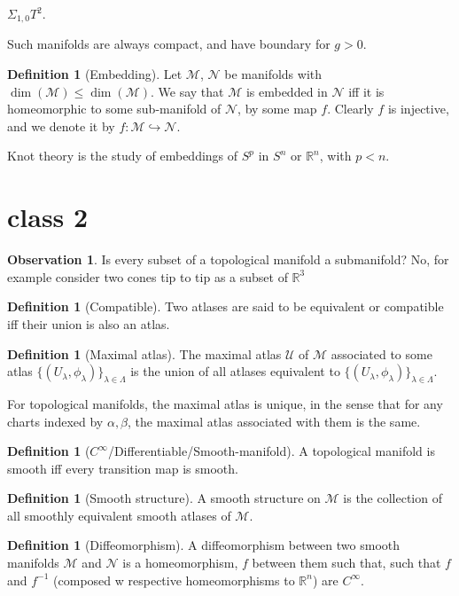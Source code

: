 \documentclass[12pt]{report}
\theoremstyle{definition}
\newtheorem{defn}[thm]{Definition}
\newtheorem*{observation}{Observation}
\newcommand{\bb}[1]{\mathbb{#1}}
\renewcommand{\cal}[1]{\mathcal{#1}}
\begin{document}
$\Sigma_{1, 0} T^2$.

Such manifolds are always compact, and have boundary for $g>0$.

\begin{defn}[Embedding]
Let $\cal{M}$, $\cal{N}$ be manifolds with $\dim(\cal{M}) \leq \dim(\cal{M})$. We say that $\cal{M}$ is embedded in $\cal{N}$ iff it is homeomorphic to some sub-manifold of $\cal{N}$, by some map $f$.
Clearly $f$ is injective, and we denote it by $f: \cal{M} \hookrightarrow \cal{N}$.
\end{defn}

Knot theory is the study of embeddings of $S^p$ in $S^n$ or $\bb{R}^n$, with $p< n$.

\section{class 2}

\begin{observation}
Is every subset of a topological manifold a submanifold? No, for example consider two cones tip to tip as a subset of $\bb{R}^3$
\end{observation}
\begin{defn}[Compatible]
Two atlases are said to be equivalent or compatible iff their union is also an atlas.
\end{defn}

\begin{defn}[Maximal atlas]
The maximal atlas $\cal{U}$ of $\cal{M}$ associated to some atlas $\{(U_\lambda, \phi_{\lambda})\}_{\lambda \in \Lambda}$ is the union of all atlases equivalent to $\{(U_\lambda, \phi_{\lambda})\}_{\lambda \in \Lambda}$.
\end{defn}

For topological manifolds, the maximal atlas is unique, in the sense that for any charts indexed by $\alpha, \beta$, the maximal atlas associated with them is the same.



\begin{defn}[$C^{\infty}$/Differentiable/Smooth-manifold]
A topological manifold is smooth iff every transition map is smooth.
\end{defn}
\begin{defn}[Smooth structure]
A smooth structure on $\cal{M}$ is the collection of all smoothly equivalent smooth atlases of $\cal{M}$.
\end{defn}
\begin{defn}[Diffeomorphism]
A diffeomorphism between two smooth manifolds $\cal{M}$ and $\cal{N}$ is a homeomorphism, $f$ between them such that, such that $f$ and $f^{-1}$ (composed w respective homeomorphisms to $\bb{R}^n$) are $C^{\infty}$.
\end{defn}
\end{document}
